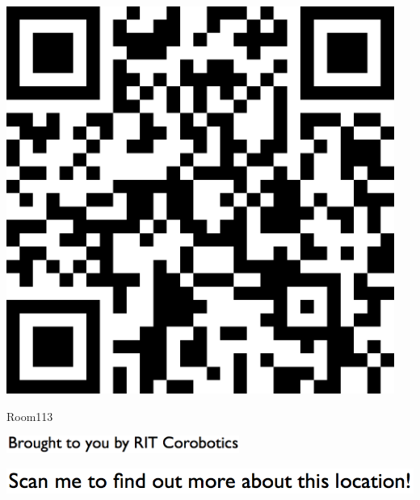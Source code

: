 \documentclass[letterpaper]{article}
\begin{document}
 \begingroup 
 \centerline{\includegraphics[scale=1,width=5in,height=5in]{Room113.png}} 
 \endgroup 
 \vspace*{\fill} 

 \hfill{\small Room113} 

  \vspace{0.7in} 
 
 \centerline{\includegraphics[scale=1,width=3in]{text-bottom.png}} 
 
 \pagebreak 
{} 
 \vspace*{\fill} 
 
  \centerline{\includegraphics[scale=1,width=6in]{text-top.png}} 
 
 \vspace{0.5in} 
 
\end{document}
